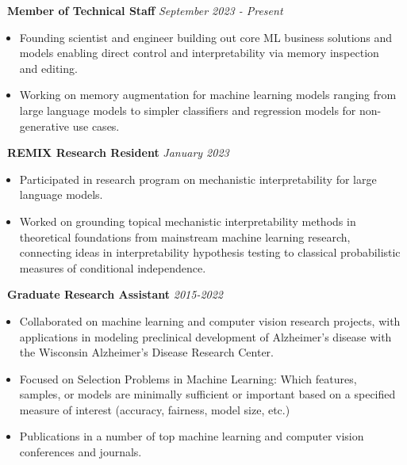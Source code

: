 \documentclass[]{article}
\begin{document}
 \newline
{\bf \ Member of Technical Staff} \hfill \textit{September 2023 - Present}
\begin{itemize}[label={$\bullet$}]
	\item Founding scientist and engineer building out core ML business solutions and models enabling direct control and interpretability via memory inspection and editing.
	\item Working on memory augmentation for machine learning models ranging from large language models to simpler classifiers and regression models for non-generative use cases.
\end{itemize}

 \newline
{\bf \ REMIX Research Resident} \hfill \textit{January 2023}
\begin{itemize}[label={$\bullet$}]
	\item Participated in research program on mechanistic interpretability for large language models.
	\item Worked on grounding topical mechanistic interpretability methods in theoretical foundations from mainstream machine learning research, connecting ideas in interpretability hypothesis testing to classical probabilistic measures of conditional independence.
\end{itemize} 

 \newline
{\bf \ Graduate Research Assistant} \hfill \textit{2015-2022}
\begin{itemize}[label={$\bullet$}]
	\item Collaborated on machine learning and computer vision research projects, with applications in modeling preclinical development of Alzheimer's disease with the Wisconsin Alzheimer's Disease Research Center.
	\item Focused on Selection Problems in Machine Learning: Which features, samples, or models are minimally sufficient or important based on a specified measure of interest (accuracy, fairness, model size, etc.)
	\item Publications in a number of top machine learning and computer vision conferences and journals.
\end{itemize} 
\end{document}
